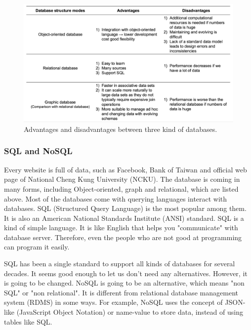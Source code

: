 \begin{enumerate}
	\begin{figure}[ht]
		\begin{center}
			\includegraphics[width=1.8\columnwidth]{Wolverine_Method_Chart_2}
		\end{center}
		\caption{Advantages and disadvantages between three kind of databases.\label{WMC2}}	
	\end{figure}
	
\end{enumerate}

\subsubsection{SQL and NoSQL}

Every website is full of data, such as Facebook, Bank of Taiwan and official web page of National Cheng Kung University (NCKU).
The database is coming in many forms, including Object-oriented, graph and relational, which are listed above.
Most of the databases come with querying languages interact with databases.
SQL (Structured Query Language) is the most popular among them.
It is also an American National Standards Institute (ANSI) standard.
SQL is a kind of simple language.
It is like English that helps you "communicate" with database server.
Therefore, even the people who are not good at programming can program it easily.


SQL has been a single standard to support all kinds of databases for several decades.
It seems good enough to let us don't need any alternatives.
However, it is going to be changed.
NoSQL is going to be an alternative, which means "non SQL" or "non relational".
It is different from relational database management system (RDMS) in some ways.
For example, NoSQL uses the concept of JSON-like (JavaScript Object Notation) or name-value to store data, instead of using tables like SQL.

